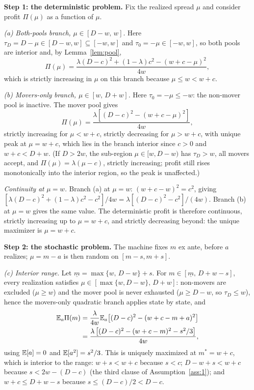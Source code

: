\textbf{Step 1: the deterministic problem.} Fix the realized spread $\mu$ and consider profit $\Pi(\mu)$ as a function of $\mu$.

\emph{(a) Both-pools branch, $\mu \in [D - w,\, w]$.} Here $\tau_D = D - \mu \in [D - w, w] \subseteq [-w, w]$ and $\tau_0 = -\mu \in [-w, w]$, so both pools are interior and, by Lemma~\ref{lem:pool},
\[
\Pi(\mu) = \frac{\lambda (D-c)^2 + (1-\lambda) c^2 - (w + c - \mu)^2}{4w},
\]
which is strictly increasing in $\mu$ on this branch because $\mu \le w < w + c$.

\emph{(b) Movers-only branch, $\mu \in [w,\, D + w]$.} Here $\tau_0 = -\mu \le -w$: the non-mover pool is inactive. The mover pool gives
\[
\Pi(\mu) = \frac{\lambda \left[ (D-c)^2 - (w + c - \mu)^2 \right]}{4w},
\]
strictly increasing for $\mu < w + c$, strictly decreasing for $\mu > w + c$, with unique peak at $\mu = w + c$, which lies in the branch interior since $c > 0$ and $w + c < D + w$. (If $D > 2w$, the sub-region $\mu \in [w, D - w)$ has $\tau_D > w$, all movers accept, and $\Pi(\mu) = \lambda(\mu - c)$, strictly increasing; profit still rises monotonically into the interior region, so the peak is unaffected.)

\emph{Continuity at $\mu = w$.} Branch (a) at $\mu = w$: $(w + c - w)^2 = c^2$, giving $[\lambda(D-c)^2 + (1-\lambda)c^2 - c^2]/4w = \lambda[(D-c)^2 - c^2]/(4w)$. Branch (b) at $\mu = w$ gives the same value. The deterministic profit is therefore continuous, strictly increasing up to $\mu = w + c$, and strictly decreasing beyond: the unique maximizer is $\mu = w + c$.

\textbf{Step 2: the stochastic problem.} The machine fixes $m$ ex ante, before $a$ realizes; $\mu = m - a$ is then random on $[m - s, m + s]$.

\emph{(c) Interior range.} Let $\underline{m} = \max\{w,\, D - w\} + s$. For $m \in [\underline{m},\, D + w - s]$, every realization satisfies $\mu \in [\max\{w, D-w\},\, D + w]$: non-movers are excluded ($\mu \ge w$) and the mover pool is never exhausted ($\mu \ge D - w$, so $\tau_D \le w$), hence the movers-only quadratic branch applies state by state, and
\begin{align*}
\mathbb{E}_a \Pi(m) &= \frac{\lambda}{4w} \mathbb{E}_a\!\left[ (D-c)^2 - (w + c - m + a)^2 \right] \\
&= \frac{\lambda \left[ (D-c)^2 - (w + c - m)^2 - s^2/3 \right]}{4w},
\end{align*}
using $\mathbb{E}[a] = 0$ and $\mathbb{E}[a^2] = s^2/3$. This is uniquely maximized at $m^* = w + c$, which is interior to the range: $w + s < w + c$ because $s < c$; $D - w + s < w + c$ because $s < 2w - (D - c)$ (the third clause of Assumption~\ref{ass:1}); and $w + c \le D + w - s$ because $s \le (D - c)/2 < D - c$.

